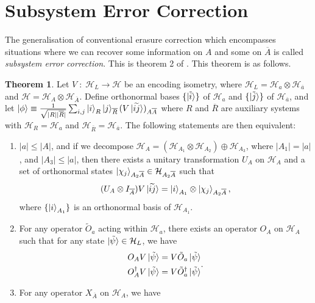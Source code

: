\documentclass[12pt,a4paper]{report}
\numberwithin{equation}{section}
\newcommand{\ol}[1]{\overline{#1}}
\theoremstyle{definition}
\theoremstyle{theorem}
\newtheorem{theorem}{Theorem}[section]
\theoremstyle{theorem}
\theoremstyle{example}
\theoremstyle{definition}
\begin{document}
\section{Subsystem Error Correction}
The generalisation of conventional erasure correction which encompasses situations where we can recover some information on $A$ and some on $\ol{A}$ is called \textit{subsystem error correction}. This is theorem 2 of \cite{Harlow}. This theorem is as follows.
\begin{theorem}
	Let $V\;:\;\mathcal{H}_{L}\to\mathcal{H}$ be an encoding isometry, where $\mathcal{H}_{L}=\mathcal{H}_{a}\otimes\mathcal{H}_{\ol{a}}$ and $\mathcal{H}=\mathcal{H}_{A}\otimes\mathcal{H}_{\ol{A}}$. Define orthonormal bases $\{\ket{\tilde{i}}\}$ of $\mathcal{H}_{a}$ and $\{\ket{\tilde{j}}\}$ of $\mathcal{H}_{\ol{a}}$, and let $\ket{\phi}\equiv\frac{1}{\sqrt{|R||\ol{R}|}}\sum_{i,j}\ket{i}_{R}\ket{j}_{\ol{R}}(V\ket{\widetilde{ij}})_{A\ol{A}}$ where $R$ and $\ol{R}$ are auxiliary systems with $\mathcal{H}_{R}=\mathcal{H}_{a}$ and $\mathcal{H}_{\ol{R}}=\mathcal{H}_{\ol{a}}$. The following statements are then equivalent:
	\begin{enumerate}
		\item $|a|\leq|A|$, and if we decompose $\mathcal{H}_{A}=(\mathcal{H}_{A_{1}}\otimes\mathcal{H}_{A_{2}})\oplus\mathcal{H}_{A_{3}}$, where $|A_{1}|=|a|$, and $|A_{3}|\leq |a|$, then there exists a unitary transformation $U_{A}$ on $\mathcal{H}_{A}$ and a set of orthonormal states $\ket{\chi_{j}}_{A_{2}\ol{A}}\in\mathcal{H}_{A_{2}\ol{A}}$ such that
		\begin{equation}\label{S1}
			(U_{A}\otimes I_{\ol{A}})V\ket{\widetilde{ij}}=\ket{i}_{A_{1}}\otimes\ket{\chi_{j}}_{A_{2}\ol{A}},
		\end{equation}
		where $\{\ket{i}_{A_{1}}\}$ is an orthonormal basis of $\mathcal{H}_{A_{1}}$.
		\item For any operator $\tilde{O}_{a}$ acting within $\mathcal{H}_{a}$, there exists an operator $O_{A}$ on $\mathcal{H}_{A}$ such that for any state $\ket{\tilde{\psi}}\in\mathcal{H}_{L}$, we have
		\begin{equation}\label{S2}
			\begin{aligned}
				O_{A}V\ket{\tilde{\psi}}&=V\tilde{O}_{a}\ket{\tilde{\psi}}\\
				O_{A}^{\dagger}V\ket{\tilde{\psi}}&=V\tilde{O}_{a}^{\dagger}\ket{\tilde{\psi}}
			\end{aligned}.
		\end{equation}
		\item For any operator $X_{\ol{A}}$ on $\mathcal{H}_{A}$, we have

\end{enumerate}
\end{theorem}
\end{document}
